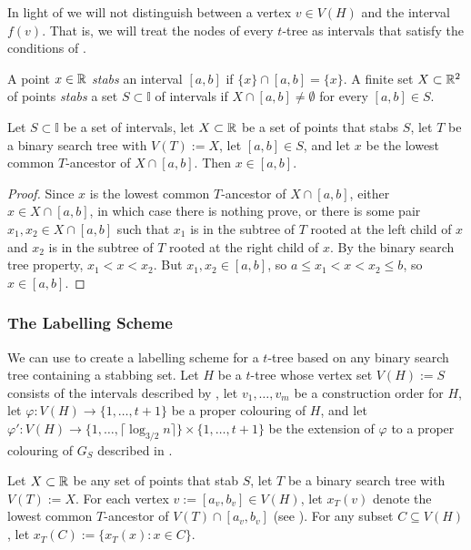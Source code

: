 \documentclass[kpfonts]{patmorin}
\begin{document}
In light of  we will not distinguish between a vertex $v\in V(H)$ and the interval $f(v)$.  That is, we will treat the nodes of every $t$-tree as intervals that satisfy the conditions of .

A point $x\in\mathbb{R}$ \emph{stabs} an interval $[a,b]$ if $\{x\}\cap [a,b]=\{x\}$. A finite set $X\subset\mathbb{R}^2$ of points \emph{stabs} a set $S\subset\mathbb{I}$ of intervals if $X\cap [a,b]\neq\emptyset$ for every $[a,b]\in S$.

\begin{lem}
  Let $S\subset\mathbb{I}$ be a set of intervals, let $X\subset\mathbb{R}$ be a set of points that stabs $S$, let $T$ be a binary search tree with $V(T):=X$, let $[a,b]\in S$, and let $x$ be the lowest common $T$-ancestor of $X\cap [a,b]$.  Then $x\in [a,b]$.
\end{lem}

\begin{proof}
  Since $x$ is the lowest common $T$-ancestor of $X\cap[a,b]$, either $x\in X\cap[a,b]$, in which case there is nothing prove, or there is some pair $x_1,x_2\in X\cap[a,b]$ such that $x_1$ is in the subtree of $T$ rooted at the left child of $x$ and $x_2$ is in the subtree of $T$ rooted at the right child of $x$.  By the binary search tree property, $x_1<x<x_2$. But $x_1,x_2 \in [a,b]$, so $a\le x_1<x<x_2\le b$, so $x\in [a,b]$.  
\end{proof}

\subsubsection{The Labelling Scheme}

We can use  to create a labelling scheme for a $t$-tree based on any binary search tree containing a stabbing set.  Let $H$ be a $t$-tree whose vertex set $V(H):=S$ consists of the intervals described by , let $v_1,\ldots,v_m$ be a construction order for $H$, let $\varphi:V(H)\to\{1,\ldots,t+1\}$ be a proper colouring of $H$, and let $\varphi':V(H)\to\{1,\ldots,\lceil\log_{3/2} n\rceil\}\times\{1,\ldots,t+1\}$ be the extension of $\varphi$ to a proper colouring of $G_S$ described in .

Let $X\subset\mathbb{R}$ be any set of points that stab $S$, let $T$ be a binary search tree with $V(T):=X$.
For each vertex $v:=[a_v,b_v]\in V(H)$, let $x_T(v)$ denote the lowest common $T$-ancestor of $V(T)\cap [a_v,b_v]$ (see ).  For any subset $C\subseteq V(H)$, let $x_T(C):=\{x_T(x):x\in C\}$.  
\end{document}

